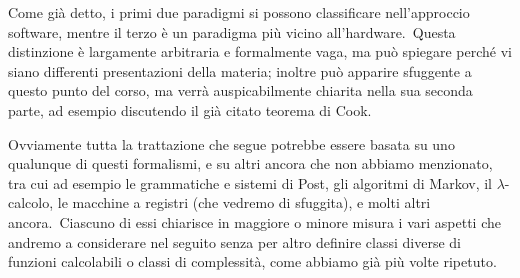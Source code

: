 \noindent Come già detto, i primi due paradigmi si possono classificare nell'approccio software, mentre il terzo è un paradigma più vicino all'hardware.\
Questa distinzione è largamente arbitraria e formalmente vaga, ma può spiegare perché vi siano differenti presentazioni della materia; inoltre può apparire sfuggente a questo punto del corso, ma verrà auspicabilmente chiarita nella sua seconda parte, ad esempio discutendo il già citato teorema di Cook.

Ovviamente tutta la trattazione che segue potrebbe essere basata su uno qualunque di questi formalismi, e su altri ancora che non abbiamo menzionato, tra cui ad esempio le grammatiche e sistemi di Post, gli algoritmi di Markov, il  $\lambda$-calcolo, le macchine a registri (che vedremo di sfuggita), e molti altri ancora.\
Ciascuno di essi chiarisce in maggiore o minore misura i vari aspetti che andremo a considerare nel seguito senza per altro definire classi diverse di funzioni calcolabili o classi di complessità, come abbiamo già più volte ripetuto.
